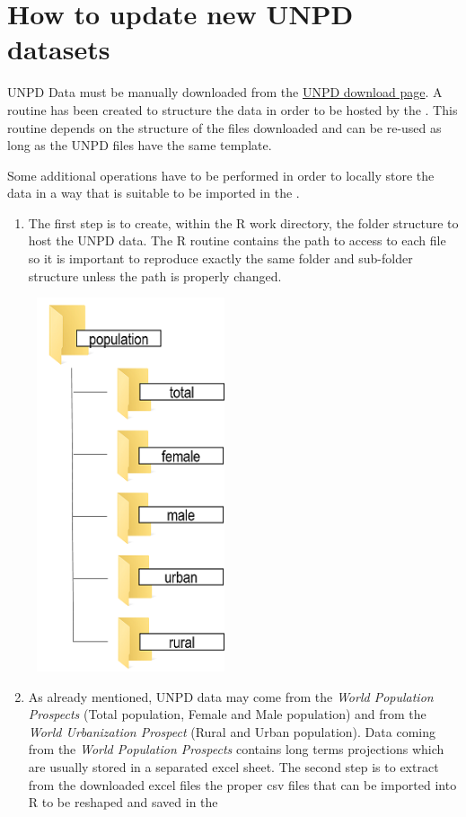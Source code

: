 \documentclass[nojss]{jss}\usepackage[]{graphicx}\usepackage[]{color}
\begin{document}
\section{How to update new UNPD datasets}

UNPD Data must be manually downloaded from the \href{http://www.un.org/en/development/desa/population/publications/database/index.shtml}{UNPD download page}. A routine has been created to structure the data in order to be hosted by the . This routine depends on the structure of the files downloaded and can be re-used as long as the UNPD files have the same template.

Some additional operations have to be performed in order to locally store the data in a way that is suitable to be imported in the .
\begin{enumerate}
\item{The first step is to create, within the R work directory, the folder structure to host the UNPD data. The R routine contains the path to access to each file so it is important to reproduce exactly the same folder and sub-folder structure unless the path is properly changed.





\begin{center}
\includegraphics[width=6cm, height=11cm]{folderStructure}
\end{center}
}
\item{As already mentioned, UNPD data may come from the \textit{World Population Prospects} (Total population, Female and Male population) and from the \textit{World Urbanization Prospect} (Rural and Urban population). Data coming from the  \textit{World Population Prospects} contains long terms projections which are usually stored in a separated excel sheet. The second step is to extract from the downloaded excel files the proper csv files that can be imported into R to be reshaped and saved in the 



}
\end{enumerate}
\end{document}
